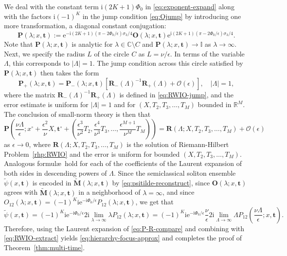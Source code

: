 \documentclass[12pt]{amsart}
\numberwithin{equation}{section}
\newcommand{\ee}{\mathrm{e}}
\newcommand{\ii}{\mathrm{i}}
\newcommand{\SP}{\lambda}
\newcommand{\phaseint}{\Phi}
\newcommand{\eps}{\epsilon}
\newcommand{\bigo}[1]{ \mathcal{O}\! \left( #1 \right) }
\begin{document}
We deal with the constant term $\ii (2K+1)\phaseint_0$ in \eqref{eq:exponent-expand} along with the factors $\ii (-1)^K$ in the jump condition \eqref{eq:Ojump} by introducing one more transformation, a diagonal constant conjugation:
\begin{equation}
\mathbf{P}(\SP;x,\mathbf{t}):=\ee^{-\ii (2K+1)(\pi-2\phaseint_0/\eps)\sigma_3/4}\mathbf{O}(\SP;x,\mathbf{t})\ee^{\ii (2K+1)(\pi-2\phaseint_0/\eps)\sigma_3/4}.
\end{equation}
Note that $\mathbf{P}(\SP;x,\mathbf{t})$ is analytic for $\SP\in\mathbb{C}\setminus C$ and $\mathbf{P}(\SP;x,\mathbf{t})\to \mathbb{I}$ as $\SP\to\infty$.
Next, we specify the radius $L$ of the circle $C$ as $L=\nu/\epsilon$.  In terms of the variable $\Lambda$, this corresponds to $|\Lambda|=1$.
The jump condition across this circle satisfied by $\mathbf{P}(\SP;x,\mathbf{t})$ then takes the form
\begin{equation}
\mathbf{P}_+(\SP;x,\mathbf{t})=\mathbf{P}_-(\SP;x,\mathbf{t})\left[\mathbf{R}_-(\Lambda)^{-1}\mathbf{R}_+(\Lambda) + \bigo{\eps}\right],\quad |\Lambda|=1,
\end{equation}
where the matrix $\mathbf{R}_-(\Lambda)^{-1}\mathbf{R}_+(\Lambda)$ is defined in \eqref{eq:RWIO-jump}, and the error estimate is uniform for $|\Lambda|=1$ and for $(X,T_2,T_3,\dots,T_M)$ bounded in $\mathbb{R}^M$.
The conclusion of small-norm theory is then that 
\begin{equation}
\mathbf{P}\left(\frac{\nu\Lambda}{\eps};x^\circ+\frac{\eps^2}{\nu}X,\mathbf{t}^\circ + \left(\frac{\eps^3}{\nu^2}T_2,\frac{\eps^4}{\nu^3}T_3,\dots,\frac{\eps^{M+1}}{\nu^M}T_M\right)\right) = 
\mathbf{R}(\Lambda;X,T_2,T_3,\dots,T_M) + \bigo{\eps}
\label{eq:P-R-compare}
\end{equation}
as $\eps\to 0$, where $\mathbf{R}(\Lambda;X,T_2,T_3,\dots,T_M)$ is the solution of Riemann-Hilbert Problem~\ref{rhp:RWIO} and the error is uniform for bounded $(X,T_2,T_3,\dots,T_M)$.  Analogous formul\ae\ hold for each of the coefficients of the Laurent expansion of both sides in descending powers of $\Lambda$.
Since the semiclassical soliton ensemble $\widetilde{\psi}(x,\mathbf{t})$ is encoded in $\widetilde{\mathbf{M}}(\SP;x,\mathbf{t})$ by \eqref{eq:psitilde-reconstruct}, since $\mathbf{O}(\SP;x,\mathbf{t})$ agrees with $\widetilde{\mathbf{M}}(\SP;x,\mathbf{t})$ in a neighborhood of $\SP=\infty$, 
and since $O_{12}(\SP;x,\mathbf{t})=(-1)^K\ii\ee^{-\ii\phaseint_0/\eps}P_{12}(\SP;x,\mathbf{t})$, we get that
\begin{equation}
\widetilde{\psi}(x,\mathbf{t})=(-1)^K\ii\ee^{-\ii\phaseint_0/\epsilon}2\ii\lim_{\SP\to\infty}\SP P_{12}(\SP;x,\mathbf{t})=(-1)^K\ii\ee^{-\ii\phaseint_0/\eps}\frac{\nu}{\eps}2\ii\lim_{\Lambda\to\infty}\Lambda P_{12}\left(\frac{\nu\Lambda}{\eps};x,\mathbf{t}\right).
\end{equation}
Therefore, using the Laurent expansion of \eqref{eq:P-R-compare} and combining with \eqref{eq:RWIO-extract} yields 
\eqref{eq:hierarchy-focus-approx} and completes the proof of Theorem~\ref{thm:multi-time}.
\end{document}
